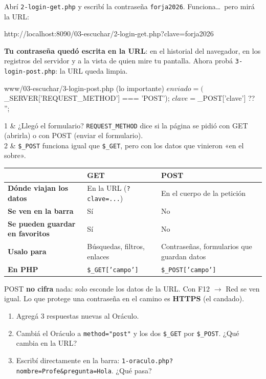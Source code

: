 Abrí \texttt{2-login-get.php} y escribí la contraseña \texttt{forja2026}. Funciona\ldots\ pero mirá la URL:
\begin{salida}
http://localhost:8090/03-escuchar/2-login-get.php?clave=forja2026
\end{salida}
\textbf{Tu contraseña quedó escrita en la URL}: en el historial del navegador, en los registros del servidor y a la vista de
quien mire tu pantalla. Ahora probá \texttt{3-login-post.php}: la URL queda limpia.
\begin{php}{www/03-escuchar/3-login-post.php (lo importante)}
$enviado = ($_SERVER['REQUEST_METHOD'] === 'POST');
$clave   = $_POST['clave'] ?? '';
\end{php}
\begin{lineas-explicadas}
1 & ¿Llegó el formulario? \texttt{REQUEST\_METHOD} dice si la página se pidió con GET (abrirla) o con POST (enviar el formulario). \\
2 & \texttt{\$\_POST} funciona igual que \texttt{\$\_GET}, pero con los datos que vinieron «en el sobre». \\
\end{lineas-explicadas}

\renewcommand{\arraystretch}{1.3}
\begin{tabularx}{\linewidth}{>{\bfseries}p{3.2cm} X X}
\toprule
 & \textbf{GET} & \textbf{POST} \\
\midrule
Dónde viajan los datos & En la URL (\texttt{?clave=...}) & En el cuerpo de la petición \\
Se ven en la barra & Sí & No \\
Se pueden guardar en favoritos & Sí & No \\
Usalo para & Búsquedas, filtros, enlaces & Contraseñas, formularios que guardan datos \\
En PHP & \texttt{\$\_GET['campo']} & \texttt{\$\_POST['campo']} \\
\bottomrule
\end{tabularx}

\begin{ojo}[Importante]
POST \textbf{no cifra} nada: solo esconde los datos de la URL. Con F12 $\rightarrow$ Red se ven igual. Lo que protege una contraseña
en el camino es \textbf{HTTPS} (el candado).
\end{ojo}

\begin{modifica}
\begin{enumerate}
  \item Agregá 3 respuestas nuevas al Oráculo. 
  \item Cambiá el Oráculo a \texttt{method="post"} y los dos \texttt{\$\_GET} por \texttt{\$\_POST}. ¿Qué cambia en la URL? 
  \item Escribí directamente en la barra: \texttt{1-oraculo.php?nombre=Profe\&pregunta=Hola}. ¿Qué pasa? 
\end{enumerate}
\end{modifica}

